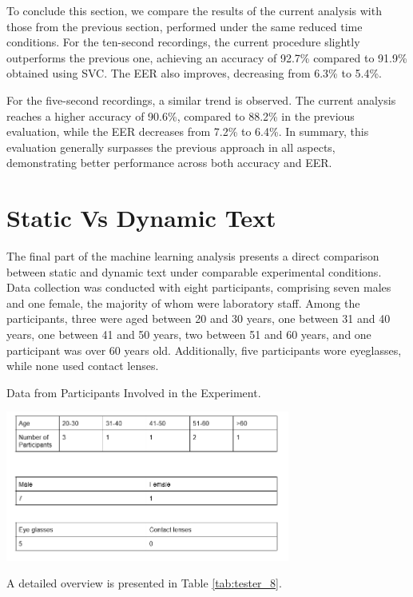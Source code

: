 \documentclass[12pt]{report}
\begin{document}
To conclude this section, we compare the results of the current analysis with those from the previous section, performed under the same reduced time conditions.
For the ten-second recordings, the current procedure slightly outperforms the previous one, achieving an accuracy of 92.7\% compared to 91.9\% obtained using SVC. 
The EER also improves, decreasing from 6.3\% to 5.4\%.

For the five-second recordings, a similar trend is observed. 
The current analysis reaches a higher accuracy of 90.6\%, compared to 88.2\% in the previous evaluation, while the EER decreases from 7.2\% to 6.4\%.
In summary, this evaluation generally surpasses the previous approach in all aspects, demonstrating better performance across both accuracy and EER.

\FloatBarrier

\section{Static Vs Dynamic Text}
\label{subsec:s_vs_d}

The final part of the machine learning analysis presents a direct comparison between static and dynamic text under comparable experimental conditions.
Data collection was conducted with eight participants, comprising seven males and one female, the majority of whom were laboratory staff.
Among the participants, three were aged between 20 and 30 years, one between 31 and 40 years, one between 41 and 50 years, two between 51 and 60 years, and one participant was over 60 years old.
Additionally, five participants wore eyeglasses, while none used contact lenses.

\begin{table}[ht]
    \centering
    \caption{Data from Participants Involved in the Experiment.}
    \includegraphics[width=0.7\textwidth]{Images/Experiment/static_vs_dynamic.png}
    \label{tab:tester_8}
\end{table}

A detailed overview is presented in Table \ref{tab:tester_8}.
\end{document}
